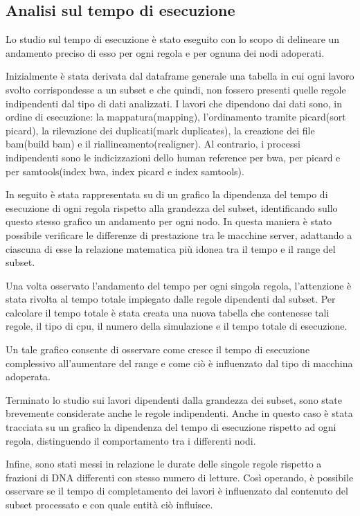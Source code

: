 \subsection{Analisi sul tempo di esecuzione}
\label{sbsec:Te}
Lo studio sul tempo di esecuzione è stato eseguito con lo scopo di delineare un andamento preciso di esso per ogni regola e per ognuna dei nodi adoperati.  

Inizialmente è stata derivata dal dataframe generale una tabella in cui ogni lavoro svolto corrispondesse a un subset e che quindi, non fossero presenti quelle regole indipendenti dal tipo di dati analizzati.
I lavori che dipendono dai dati sono, in ordine di esecuzione: la mappatura(mapping), l'ordinamento tramite picard(sort picard), la rilevazione dei duplicati(mark duplicates), la creazione dei file bam(build bam) e il riallineamento(realigner).
Al contrario, i processi indipendenti sono le indicizzazioni dello human reference per bwa, per picard e per samtools(index bwa, index picard e index samtools). 

In seguito è stata rappresentata su di un grafico la dipendenza del tempo di esecuzione di ogni regola rispetto alla grandezza del subset, identificando sullo questo stesso grafico un andamento per ogni nodo. 
In questa maniera è stato possibile verificare le differenze di prestazione tra le macchine server, adattando a ciascuna di esse la relazione matematica più idonea tra il tempo e il range del subset.

Una volta osservato l'andamento del tempo per ogni singola regola, l'attenzione è stata rivolta al tempo totale impiegato dalle regole dipendenti dal subset.
Per calcolare il tempo totale è stata creata una nuova tabella che contenesse tali regole, il tipo di cpu, il numero della simulazione e il tempo totale di esecuzione.

Un tale grafico consente di osservare come cresce il tempo di esecuzione complessivo all'aumentare del range e come ciò è influenzato dal tipo di macchina adoperata.

Terminato lo studio sui lavori dipendenti dalla grandezza dei subset, sono state brevemente considerate anche le regole indipendenti.
Anche in questo caso è stata tracciata su un grafico la dipendenza del tempo di esecuzione rispetto ad ogni regola, distinguendo il comportamento tra i differenti nodi.  

Infine, sono stati messi in relazione le durate delle singole regole rispetto a frazioni di DNA differenti con stesso numero di letture.
Così operando, è possibile osservare se il tempo di completamento dei lavori è influenzato dal contenuto del subset processato e con quale entità ciò influisce.

